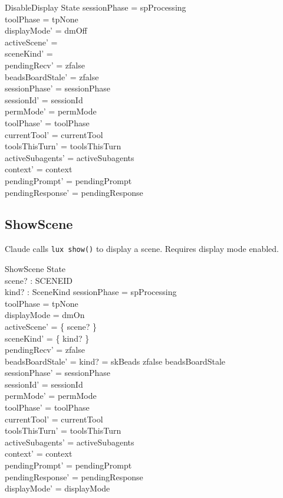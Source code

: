 \documentclass[a4paper,10pt,fleqn]{article}
\begin{document}
\begin{schema}{DisableDisplay}
  \Delta State
  \where
  sessionPhase = spProcessing \\
  toolPhase = tpNone \\
  displayMode' = dmOff \\
  activeScene' = \emptyset \\
  sceneKind' = \emptyset \\
  pendingRecv' = zfalse \\
  beadsBoardStale' = zfalse \\
  sessionPhase' = sessionPhase \\
  sessionId' = sessionId \\
  permMode' = permMode \\
  toolPhase' = toolPhase \\
  currentTool' = currentTool \\
  toolsThisTurn' = toolsThisTurn \\
  activeSubagents' = activeSubagents \\
  context' = context \\
  pendingPrompt' = pendingPrompt \\
  pendingResponse' = pendingResponse
\end{schema}

\subsection{ShowScene}

Claude calls \texttt{lux show()} to display a scene. Requires
display mode enabled.

\begin{schema}{ShowScene}
  \Delta State \\
  scene? : SCENEID \\
  kind? : SceneKind
  \where
  sessionPhase = spProcessing \\
  toolPhase = tpNone \\
  displayMode = dmOn \\
  activeScene' = \{ scene? \} \\
  sceneKind' = \{ kind? \} \\
  pendingRecv' = zfalse \\
  beadsBoardStale' = \IF kind? = skBeads \THEN zfalse \ELSE beadsBoardStale \\
  sessionPhase' = sessionPhase \\
  sessionId' = sessionId \\
  permMode' = permMode \\
  toolPhase' = toolPhase \\
  currentTool' = currentTool \\
  toolsThisTurn' = toolsThisTurn \\
  activeSubagents' = activeSubagents \\
  context' = context \\
  pendingPrompt' = pendingPrompt \\
  pendingResponse' = pendingResponse \\
  displayMode' = displayMode
\end{schema}
\end{document}
